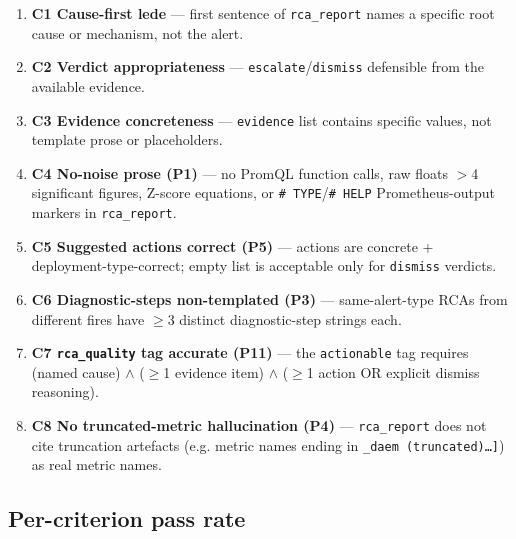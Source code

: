 \documentclass[11pt,a4paper,oneside]{report}
\begin{document}
\begin{enumerate}
  \item \textbf{C1 Cause-first lede} --- first sentence of
        \texttt{rca\_report} names a specific root cause or
        mechanism, not the alert.
  \item \textbf{C2 Verdict appropriateness} ---
        \texttt{escalate}/\texttt{dismiss} defensible from the
        available evidence.
  \item \textbf{C3 Evidence concreteness} --- \texttt{evidence}
        list contains specific values, not template prose or
        placeholders.
  \item \textbf{C4 No-noise prose (P1)} --- no PromQL function
        calls, raw floats $>$4 significant figures, Z-score
        equations, or \texttt{\# TYPE}/\texttt{\# HELP}
        Prometheus-output markers in \texttt{rca\_report}.
  \item \textbf{C5 Suggested actions correct (P5)} --- actions
        are concrete + deployment-type-correct; empty list is
        acceptable only for \texttt{dismiss} verdicts.
  \item \textbf{C6 Diagnostic-steps non-templated (P3)} ---
        same-alert-type RCAs from different fires have $\geq$3
        distinct diagnostic-step strings each.
  \item \textbf{C7 \texttt{rca\_quality} tag accurate (P11)} ---
        the \texttt{actionable} tag requires (named cause)
        $\land$ ($\geq$1 evidence item) $\land$ ($\geq$1 action
        OR explicit dismiss reasoning).
  \item \textbf{C8 No truncated-metric hallucination (P4)} ---
        \texttt{rca\_report} does not cite truncation artefacts
        (e.g. metric names ending in
        \texttt{\_daem (truncated)\ldots]}) as real metric
        names.
\end{enumerate}

\subsection{Per-criterion pass rate}
\end{document}

